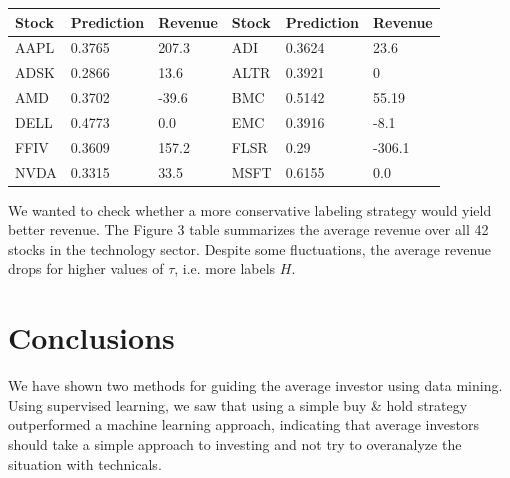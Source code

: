 \documentclass[10pt]{article}
\begin{document}
    \begin{center}
\begin{tabular}{| l | l | l || l | l | l |}
\hline
Stock & Prediction & Revenue & Stock & Prediction & Revenue\\
\hline
AAPL & 0.3765 & 207.3 & ADI & 0.3624 & 23.6\\
\hline
ADSK & 0.2866 & 13.6 &  ALTR & 0.3921 & 0\\
\hline
AMD & 0.3702 & -39.6 & BMC & 0.5142 & 55.19\\
\hline
DELL & 0.4773 & 0.0 & EMC & 0.3916 & -8.1\\
\hline
FFIV & 0.3609 & 157.2 & FLSR & 0.29 & -306.1\\
\hline
NVDA & 0.3315 & 33.5 & MSFT & 0.6155 & 0.0\\
\hline
\end{tabular}
    \end{center}

We wanted to check whether a more conservative labeling strategy would yield
better revenue. The Figure 3 table summarizes the average revenue over all 42
stocks in the technology sector. Despite some fluctuations, the average revenue
drops for higher values of $\tau$, i.e. more labels $H$.
% 
\section{Conclusions}
\label{sec:conclusion}

We have shown two methods for guiding the average investor using data mining.
Using supervised learning, we saw that using a simple buy \& hold strategy
outperformed a machine learning approach, indicating that average investors
should take a simple approach to investing and not try to overanalyze the
situation with technicals.
\end{document}

